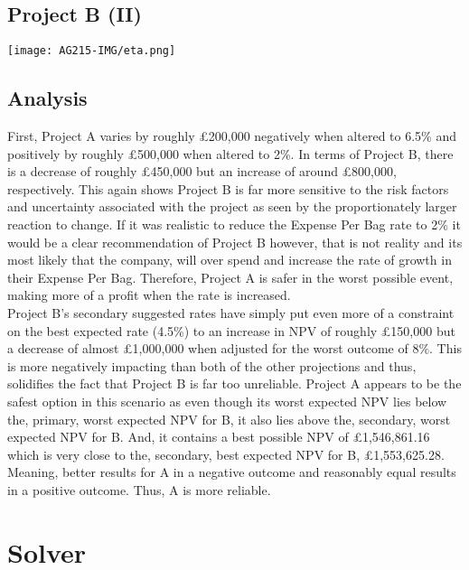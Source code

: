 \documentclass[11pt, english]{article}
\begin{document}
	\subsection{Project B (II)}

        \begin{center}
                \texttt{[image: AG215-IMG/eta.png]} 
        \end{center}

	\subsection{Analysis}

	First, Project A varies by roughly \pounds200,000 negatively when altered to 6.5\% and positively by roughly £500,000 when altered to 2\%. In terms of Project B, there is a decrease of roughly \pounds450,000 but an increase of around \pounds800,000, respectively. This again shows Project B is far more sensitive to the risk factors and uncertainty associated with the project as seen by the proportionately larger reaction to change. If it was realistic to reduce the Expense Per Bag rate to 2\% it would be a clear recommendation of Project B however, that is not reality and its most likely that the company, will over spend and increase the rate of growth in their Expense Per Bag. Therefore, Project A is safer in the worst possible event, making more of a profit when the rate is increased.\\

	Project B’s secondary suggested rates have simply put even more of a constraint on the best expected rate (4.5\%) to an increase in NPV of roughly \pounds150,000 but a decrease of almost \pounds1,000,000 when adjusted for the worst outcome of 8\%. This is more negatively impacting than both of the other projections and thus, solidifies the fact that Project B is far too unreliable. Project A appears to be the safest option in this scenario as even though its worst expected NPV lies below the, primary, worst expected NPV for B, it also lies above the, secondary, worst expected NPV for B. And, it contains a best possible NPV of \pounds1,546,861.16 which is very close to the, secondary, best expected NPV for B, \pounds1,553,625.28. Meaning, better results for A in a negative outcome and reasonably equal results in a positive outcome. Thus, A is more reliable.

\newpage

\section{Solver}
\end{document}
